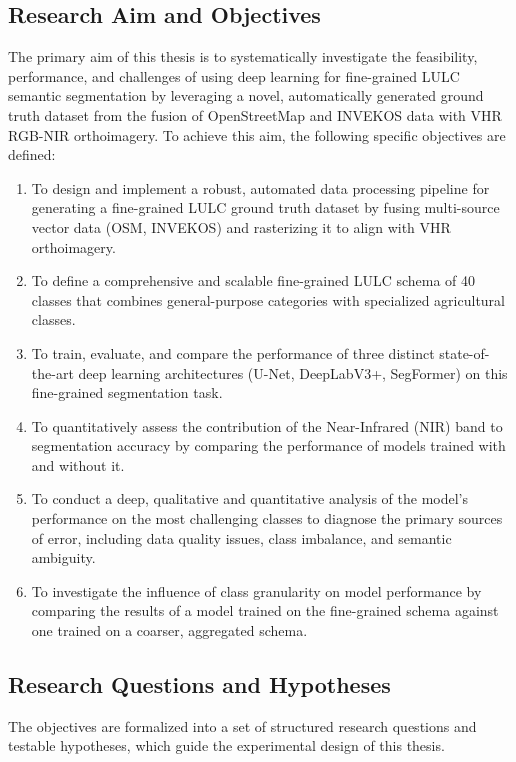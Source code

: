 \documentclass{report}
\begin{document}
\subsection{Research Aim and Objectives}
The primary aim of this thesis is to systematically investigate the feasibility, performance, and challenges of using deep learning for fine-grained LULC semantic segmentation by leveraging a novel, automatically generated ground truth dataset from the fusion of OpenStreetMap and INVEKOS data with VHR RGB-NIR orthoimagery.
To achieve this aim, the following specific objectives are defined:
\begin{enumerate}
\item To design and implement a robust, automated data processing pipeline for generating a fine-grained LULC ground truth dataset by fusing multi-source vector data (OSM, INVEKOS) and rasterizing it to align with VHR orthoimagery.
\item To define a comprehensive and scalable fine-grained LULC schema of 40 classes that combines general-purpose categories with specialized agricultural classes.
\item To train, evaluate, and compare the performance of three distinct state-of-the-art deep learning architectures (U-Net, DeepLabV3+, SegFormer) on this fine-grained segmentation task.
\item To quantitatively assess the contribution of the Near-Infrared (NIR) band to segmentation accuracy by comparing the performance of models trained with and without it.
\item To conduct a deep, qualitative and quantitative analysis of the model's performance on the most challenging classes to diagnose the primary sources of error, including data quality issues, class imbalance, and semantic ambiguity.
\item To investigate the influence of class granularity on model performance by comparing the results of a model trained on the fine-grained schema against one trained on a coarser, aggregated schema.
\end{enumerate}
\subsection{Research Questions and Hypotheses}
The objectives are formalized into a set of structured research questions and testable hypotheses, which guide the experimental design of this thesis.
\end{document}
